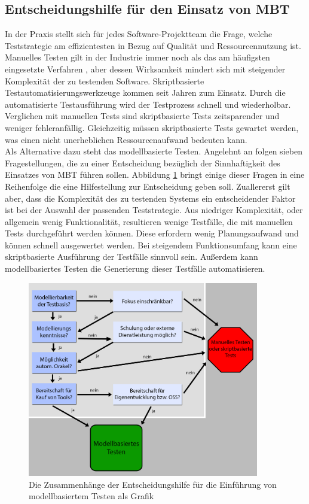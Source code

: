 \subsection{Entscheidungshilfe für den Einsatz von MBT}
\label{sec:entscheidungshilfe}
In der Praxis stellt sich für jedes Software-Projektteam die Frage, welche Teststrategie am effizientesten in Bezug auf Qualität und Ressourcennutzung ist. Manuelles Testen gilt in der Industrie immer noch als das am häufigsten eingesetzte Verfahren \cite{guldali_starthilfe_2010}, aber dessen Wirksamkeit mindert sich mit steigender Komplexität der zu testenden Software. Skriptbasierte Testautomatisierungswerkzeuge kommen seit Jahren zum Einsatz. Durch die automatisierte Testausführung wird der Testprozess schnell und wiederholbar. Verglichen mit manuellen Tests sind skriptbasierte Tests zeitsparender und weniger fehleranfällig. Gleichzeitig müssen skriptbasierte Tests gewartet werden, was einen nicht unerheblichen Ressourcenaufwand bedeuten kann.\\
Als Alternative dazu steht das modellbasierte Testen. Angelehnt an \citeauthor{guldali_starthilfe_2010} \cite{guldali_starthilfe_2010} folgen sieben Fragestellungen, die zu einer Entscheidung bezüglich der Sinnhaftigkeit des Einsatzes von \Gls{MBT} führen sollen. Abbildung \ref{fig:entscheidungshilfe_mbt} bringt einige dieser Fragen in eine Reihenfolge die eine Hilfestellung zur Entscheidung geben soll. Zuallererst gilt aber, dass die Komplexität des zu testenden Systems ein entscheidender Faktor ist bei der Auswahl der passenden Teststrategie. Aus niedriger Komplexität, oder allgemein wenig Funktionalität, resultieren wenige Testfälle, die mit manuellen Tests durchgeführt werden können. Diese erfordern wenig Planungsaufwand und können schnell ausgewertet werden. Bei steigendem Funktionsumfang kann eine skriptbasierte Ausführung der Testfälle sinnvoll sein. Außerdem kann modellbasiertes Testen die Generierung dieser Testfälle automatisieren. 

\begin{figure}[h] 
  \centering
     \includegraphics[width=0.9\textwidth]{figures/entscheidungshilfe_mbt.png}
  \caption{Die Zusammenhänge der Entscheidungshilfe für die Einführung von modellbasiertem Testen als Grafik}
  \label{fig:entscheidungshilfe_mbt}
\end{figure}

